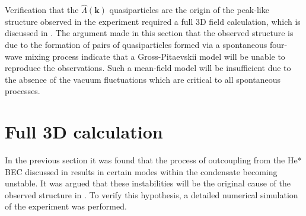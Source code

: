 Verification that the $\hat{\Lambda}(\bm{k})$ quasiparticles are the origin of the peak-like structure observed in the experiment required a full 3D field calculation, which is discussed in .  The argument made in this section that the observed structure is due to the formation of pairs of quasiparticles formed via a spontaneous four-wave mixing process indicate that a Gross-Pitaevskii model will be unable to reproduce the observations. Such a mean-field model will be insufficient due to the absence of the vacuum fluctuations which are critical to all spontaneous processes.

\section{Full 3D calculation}
\label{Peaks:3DCalculation}
In the previous section it was found that the process of outcoupling from the He* BEC discussed in  results in certain modes within the condensate becoming unstable. It was argued that these instabilities will be the original cause of the observed structure in . To verify this hypothesis, a detailed numerical simulation of the experiment was performed.

